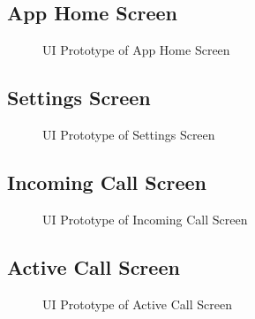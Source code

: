 \subsection{App Home Screen}
\begin{figure}[H]
    \centering
    \caption{UI Prototype of App Home Screen}
    \label{fig:app_home}
\end{figure}

\subsection{Settings Screen}
\begin{figure}[H]
    \centering
    \caption{UI Prototype of Settings Screen}
    \label{fig:app_set}
\end{figure}

\subsection{Incoming Call Screen}
\begin{figure}[H]
    \centering
    \caption{UI Prototype of Incoming Call Screen}
    \label{fig:app_incoming}
\end{figure}

\subsection{Active Call Screen}
\begin{figure}[H]
    \centering
    \caption{UI Prototype of Active Call Screen}
    \label{fig:app_in_call}
\end{figure}
